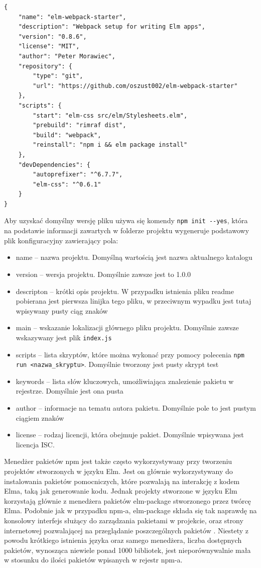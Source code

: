 \begin{minipage}{\linewidth}
\begin{lstlisting}[caption=Przykładowy plik package.json, tabsize=2, label=listing:package]
{
	"name": "elm-webpack-starter",
	"description": "Webpack setup for writing Elm apps",
	"version": "0.8.6",
	"license": "MIT",
	"author": "Peter Morawiec",
	"repository": {
		"type": "git",
		"url": "https://github.com/oszust002/elm-webpack-starter"
	},
	"scripts": {
		"start": "elm-css src/elm/Stylesheets.elm",
		"prebuild": "rimraf dist",
		"build": "webpack",
		"reinstall": "npm i && elm package install"
	},
	"devDependencies": {
		"autoprefixer": "^6.7.7",
		"elm-css": "^0.6.1"
	}
}
\end{lstlisting}
\end{minipage}
Aby uzyskać domyślny wersję pliku używa się komendy \lstinline{npm init --yes}, która na podstawie informacji zawartych w folderze projektu wygeneruje podstawowy plik konfiguracyjny zawierający pola:
\begin{itemize}
	\item name -- nazwa projektu. Domyślną wartością jest nazwa aktualnego katalogu
	\item version -- wersja projektu. Domyślnie zawsze jest to 1.0.0
	\item descripton -- krótki opis projektu. W przypadku istnienia pliku readme pobierana jest pierwsza linijka tego pliku, w przeciwnym wypadku jest tutaj wpisywany pusty ciąg znaków
	\item main -- wskazanie lokalizacji głównego pliku projektu. Domyślnie zawsze wskazywany jest plik \lstinline{index.js}
	\item scripts -- lista skryptów, które można wykonać przy pomocy polecenia \lstinline{npm run <nazwa_skryptu>}. Domyślnie tworzony jest pusty skrypt test
	\item keywords -- lista słów kluczowych, umożliwiająca znalezienie pakietu w rejestrze. Domyślnie jest ona pusta
	\item author -- informacje na tematu autora pakietu. Domyślnie pole to jest pustym ciągiem znaków
	\item license -- rodzaj licencji, która obejmuje pakiet. Domyślnie wpisywana jest licencja ISC.
\end{itemize}

Menedżer pakietów npm jest także często wykorzystywany przy tworzeniu projektów stworzonych w języku Elm. Jest on głównie wykorzystywany do instalowania pakietów pomocniczych, które pozwalają na interakcję z kodem Elma, taką jak generowanie kodu. Jednak projekty stworzone w języku Elm korzystają głównie z menedżera pakietów elm-package stworzonego przez twórcę Elma. Podobnie jak w przypadku npm-a, elm-package składa się tak naprawdę na konsolowy interfejs służący do zarządzania pakietami w projekcie, oraz strony internetowej pozwalającej na przeglądanie poszczególnych pakietów \cite{elmPackage}. Niestety z powodu krótkiego istnienia języka oraz samego menedżera, liczba dostępnych pakietów, wynosząca niewiele ponad 1000 bibliotek, jest nieporównywalnie mała w stosunku do ilości pakietów wpisanych w rejestr npm-a. 

